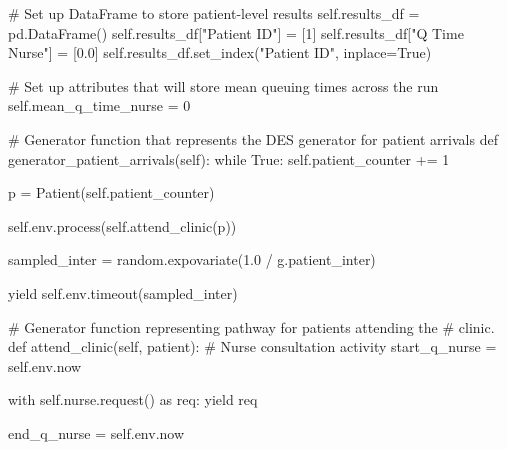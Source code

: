 \documentclass[
  letterpaper,
  DIV=11,
  numbers=noendperiod]{scrreprt}
\newenvironment{Shaded}{\begin{snugshade}}{\end{snugshade}}
\newcommand{\CommentTok}[1]{\textcolor[rgb]{0.37,0.37,0.37}{#1}}
\newcommand{\ControlFlowTok}[1]{\textcolor[rgb]{0.00,0.23,0.31}{#1}}
\newcommand{\DecValTok}[1]{\textcolor[rgb]{0.68,0.00,0.00}{#1}}
\newcommand{\FloatTok}[1]{\textcolor[rgb]{0.68,0.00,0.00}{#1}}
\newcommand{\ImportTok}[1]{\textcolor[rgb]{0.00,0.46,0.62}{#1}}
\newcommand{\KeywordTok}[1]{\textcolor[rgb]{0.00,0.23,0.31}{#1}}
\newcommand{\NormalTok}[1]{\textcolor[rgb]{0.00,0.23,0.31}{#1}}
\newcommand{\OperatorTok}[1]{\textcolor[rgb]{0.37,0.37,0.37}{#1}}
\newcommand{\StringTok}[1]{\textcolor[rgb]{0.13,0.47,0.30}{#1}}
\newcommand{\VariableTok}[1]{\textcolor[rgb]{0.07,0.07,0.07}{#1}}
\begin{document}
\begin{Shaded}
\begin{Highlighting}[]
        \CommentTok{\# Set up DataFrame to store patient{-}level results}
        \VariableTok{self}\NormalTok{.results\_df }\OperatorTok{=}\NormalTok{ pd.DataFrame()}
        \VariableTok{self}\NormalTok{.results\_df[}\StringTok{"Patient ID"}\NormalTok{] }\OperatorTok{=}\NormalTok{ [}\DecValTok{1}\NormalTok{]}
        \VariableTok{self}\NormalTok{.results\_df[}\StringTok{"Q Time Nurse"}\NormalTok{] }\OperatorTok{=}\NormalTok{ [}\FloatTok{0.0}\NormalTok{]}
        \VariableTok{self}\NormalTok{.results\_df.set\_index(}\StringTok{"Patient ID"}\NormalTok{, inplace}\OperatorTok{=}\VariableTok{True}\NormalTok{)}

        \CommentTok{\# Set up attributes that will store mean queuing times across the run}
        \VariableTok{self}\NormalTok{.mean\_q\_time\_nurse }\OperatorTok{=} \DecValTok{0}

    \CommentTok{\# Generator function that represents the DES generator for patient arrivals}
    \KeywordTok{def}\NormalTok{ generator\_patient\_arrivals(}\VariableTok{self}\NormalTok{):}
        \ControlFlowTok{while} \VariableTok{True}\NormalTok{:}
            \VariableTok{self}\NormalTok{.patient\_counter }\OperatorTok{+=} \DecValTok{1}

\NormalTok{            p }\OperatorTok{=}\NormalTok{ Patient(}\VariableTok{self}\NormalTok{.patient\_counter)}

            \VariableTok{self}\NormalTok{.env.process(}\VariableTok{self}\NormalTok{.attend\_clinic(p))}

\NormalTok{            sampled\_inter }\OperatorTok{=}\NormalTok{ random.expovariate(}\FloatTok{1.0} \OperatorTok{/}\NormalTok{ g.patient\_inter)}

            \ControlFlowTok{yield} \VariableTok{self}\NormalTok{.env.timeout(sampled\_inter)}

    \CommentTok{\# Generator function representing pathway for patients attending the}
    \CommentTok{\# clinic.}
    \KeywordTok{def}\NormalTok{ attend\_clinic(}\VariableTok{self}\NormalTok{, patient):}
        \CommentTok{\# Nurse consultation activity}
\NormalTok{        start\_q\_nurse }\OperatorTok{=} \VariableTok{self}\NormalTok{.env.now}

        \ControlFlowTok{with} \VariableTok{self}\NormalTok{.nurse.request() }\ImportTok{as}\NormalTok{ req:}
            \ControlFlowTok{yield}\NormalTok{ req}

\NormalTok{            end\_q\_nurse }\OperatorTok{=} \VariableTok{self}\NormalTok{.env.now}


\end{Highlighting}
\end{Shaded}
\end{document}
